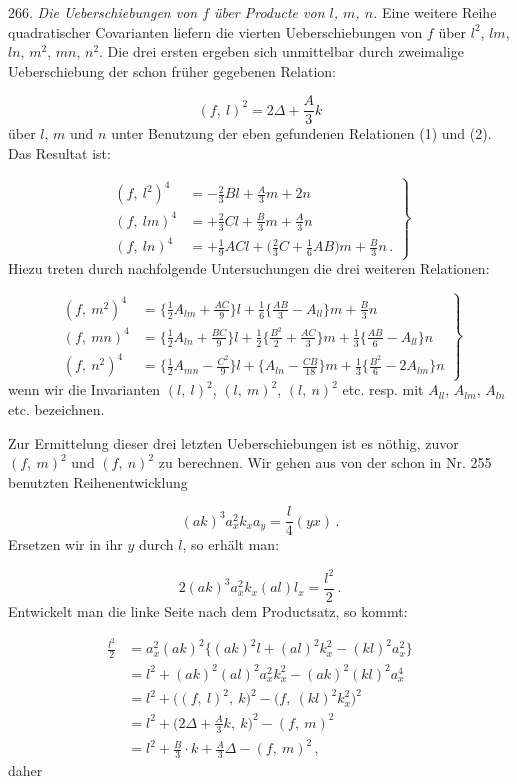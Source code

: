 \documentclass[11pt]{article}
\providecommand{\weberpage}[1]{}
\providecommand{\weq}[2]{\begin{equation}\tag{#1}#2\end{equation}}
\let\Delta\varDelta
\begin{document}
266. \textit{Die Ueberschiebungen von $f$ über Producte von $l$, $m$, $n$.}
Eine weitere Reihe quadratischer Covarianten liefern die vierten
Ueberschiebungen von $f$ über $l^2$, $lm$, $ln$, $m^2$, $mn$, $n^2$. Die drei
ersten ergeben sich unmittelbar durch zweimalige Ueberschiebung der schon
früher gegebenen Relation:

\[
(f,\ l)^2 = 2\Delta + \frac{A}{3}k
\]
über $l$, $m$ und $n$ unter Benutzung der eben gefundenen Relationen (1) und
(2). Das Resultat ist:

\weq{3}{\left.\begin{aligned}
(f,\ l^2)^4 &= -\frac{2}{3}Bl+\frac{A}{3}m+2n\\
(f,\ lm)^4 &= +\frac{2}{3}Cl+\frac{B}{3}m+\frac{A}{3}n\\
(f,\ ln)^4 &= +\frac{1}{9}ACl+\Big(\frac{2}{3}C+\frac{1}{6}AB\Big)m+\frac{B}{3}n\,.
\end{aligned}\right\}}
Hiezu treten durch nachfolgende Untersuchungen die drei weiteren Relationen:


\weberpage{288}

\weq{4}{\left.\begin{aligned}
(f,\ m^2)^4 &= \Big\{\frac{1}{2}A_{lm}+\frac{AC}{9}\Big\}l+\frac{1}{6}\Big\{\frac{AB}{3}-A_{ll}\Big\}m+\frac{B}{3}n\\
(f,\ mn)^4 &= \Big\{\frac{1}{2}A_{ln}+\frac{BC}{9}\Big\}l+\frac{1}{2}\Big\{\frac{B^2}{2}+\frac{AC}{3}\Big\}m+\frac{1}{3}\Big\{\frac{AB}{6}-A_{ll}\Big\}n\\
(f,\ n^2)^4 &= \Big\{\frac{1}{2}A_{mn}-\frac{C^2}{9}\Big\}l+\Big\{A_{ln}-\frac{CB}{18}\Big\}m+\frac{1}{3}\Big\{\frac{B^2}{6}-2A_{lm}\Big\}n
\end{aligned}\right\}}
wenn wir die Invarianten $(l,\ l)^2$, $(l,\ m)^2$, $(l,\ n)^2$ etc. resp. mit
$A_{ll}$, $A_{lm}$, $A_{ln}$ etc. bezeichnen.

Zur Ermittelung dieser drei letzten Ueberschiebungen ist es nöthig, zuvor
$(f,\ m)^2$ und $(f,\ n)^2$ zu berechnen. Wir gehen aus von der schon in
Nr. 255 benutzten Reihenentwicklung

\weq{$\beta$}{(ak)^3a_x^2k_xa_y = \frac{l}{4}(yx)\,.}
Ersetzen wir in ihr $y$ durch $l$, so erhält man:

\[
2(ak)^3a_x^2k_x(al)l_x = \frac{l^2}{2}\,.
\]
Entwickelt man die linke Seite nach dem Productsatz, so kommt:

\[
\begin{aligned}
\frac{l^2}{2} &= a_x^2(ak)^2\big\{(ak)^2l+(al)^2k_x^2-(kl)^2a_x^2\big\}\\
&= l^2+(ak)^2(al)^2a_x^2k_x^2-(ak)^2(kl)^2a_x^4\\
&= l^2+\big((f,\ l)^2,\ k\big)^2-\big(f,\ (kl)^2k_x^2\big)^2\\
&= l^2+\Big(2\Delta+\frac{A}{3}k,\ k\Big)^2-(f,\ m)^2\\
&= l^2+\frac{B}{3}\cdot k+\frac{A}{3}\Delta-(f,\ m)^2\,,
\end{aligned}
\]
daher
\end{document}
